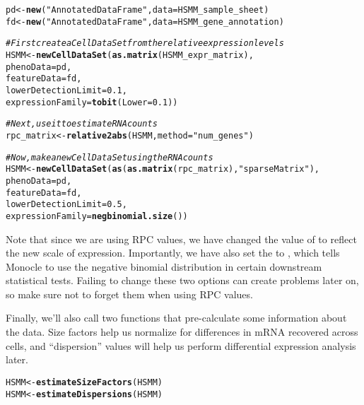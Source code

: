 \documentclass[10pt,oneside]{article}\usepackage[]{graphicx}\usepackage[]{color}
\makeatletter
\newcommand{\hlnum}[1]{\textcolor[rgb]{0.686,0.059,0.569}{#1}}%
\newcommand{\hlstr}[1]{\textcolor[rgb]{0.192,0.494,0.8}{#1}}%
\newcommand{\hlcom}[1]{\textcolor[rgb]{0.678,0.584,0.686}{\textit{#1}}}%
\newcommand{\hlstd}[1]{\textcolor[rgb]{0.345,0.345,0.345}{#1}}%
\newcommand{\hlkwb}[1]{\textcolor[rgb]{0.69,0.353,0.396}{#1}}%
\newcommand{\hlkwc}[1]{\textcolor[rgb]{0.333,0.667,0.333}{#1}}%
\newcommand{\hlkwd}[1]{\textcolor[rgb]{0.737,0.353,0.396}{\textbf{#1}}}%
\newenvironment{kframe}{%
 \def\at@end@of@kframe{}%
 \ifinner\ifhmode%
  \def\at@end@of@kframe{\end{minipage}}%
  \begin{minipage}{\columnwidth}%
 \fi\fi%
 \def\FrameCommand##1{\hskip\@totalleftmargin \hskip-\fboxsep
 \colorbox{shadecolor}{##1}\hskip-\fboxsep
     \hskip-\linewidth \hskip-\@totalleftmargin \hskip\columnwidth}%
 \MakeFramed {\advance\hsize-\width
   \@totalleftmargin\z@ \linewidth\hsize
   \@setminipage}}%
 {\par\unskip\endMakeFramed%
 \at@end@of@kframe}
\newenvironment{knitrout}{}{} %
\makeatother
\begin{document}
\begin{knitrout}
\color{fgcolor}\begin{kframe}
\begin{alltt}
\hlstd{pd} \hlkwb{<-} \hlkwd{new}\hlstd{(}\hlstr{"AnnotatedDataFrame"}\hlstd{,} \hlkwc{data} \hlstd{= HSMM_sample_sheet)}
\hlstd{fd} \hlkwb{<-} \hlkwd{new}\hlstd{(}\hlstr{"AnnotatedDataFrame"}\hlstd{,} \hlkwc{data} \hlstd{= HSMM_gene_annotation)}

\hlcom{# First create a CellDataSet from the relative expression levels}
\hlstd{HSMM} \hlkwb{<-} \hlkwd{newCellDataSet}\hlstd{(}\hlkwd{as.matrix}\hlstd{(HSMM_expr_matrix),}
                       \hlkwc{phenoData} \hlstd{= pd,}
                       \hlkwc{featureData} \hlstd{= fd,}
                       \hlkwc{lowerDetectionLimit}\hlstd{=}\hlnum{0.1}\hlstd{,}
                       \hlkwc{expressionFamily}\hlstd{=}\hlkwd{tobit}\hlstd{(}\hlkwc{Lower}\hlstd{=}\hlnum{0.1}\hlstd{))}

\hlcom{# Next, use it to estimate RNA counts}
\hlstd{rpc_matrix} \hlkwb{<-} \hlkwd{relative2abs}\hlstd{(HSMM,} \hlkwc{method} \hlstd{=} \hlstr{"num_genes"}\hlstd{)}

\hlcom{# Now, make a new CellDataSet using the RNA counts}
\hlstd{HSMM} \hlkwb{<-} \hlkwd{newCellDataSet}\hlstd{(}\hlkwd{as}\hlstd{(}\hlkwd{as.matrix}\hlstd{(rpc_matrix),} \hlstr{"sparseMatrix"}\hlstd{),}
                       \hlkwc{phenoData} \hlstd{= pd,}
                       \hlkwc{featureData} \hlstd{= fd,}
                       \hlkwc{lowerDetectionLimit}\hlstd{=}\hlnum{0.5}\hlstd{,}
                       \hlkwc{expressionFamily}\hlstd{=}\hlkwd{negbinomial.size}\hlstd{())}
\end{alltt}
\end{kframe}
\end{knitrout}
 
 Note that since we are using RPC values, we have changed the value of  to reflect the new scale of expression. Importantly, we have also set the  to , which tells Monocle to use the negative binomial distribution in certain downstream statistical tests. Failing to change these two options can create problems later on, so make sure not to forget them when using RPC values.
 
 
 Finally, we'll also call two functions that pre-calculate some information about the data. Size factors help us normalize for differences in mRNA recovered across cells, and ``dispersion'' values will help us perform differential expression analysis later.
\begin{knitrout}
\color{fgcolor}\begin{kframe}
\begin{alltt}
\hlstd{HSMM} \hlkwb{<-} \hlkwd{estimateSizeFactors}\hlstd{(HSMM)}
\hlstd{HSMM} \hlkwb{<-} \hlkwd{estimateDispersions}\hlstd{(HSMM)}
\end{alltt}


{\ttfamily\noindent\itshape\color{messagecolor}{\#\# Removing 139 outliers}}\end{kframe}
\end{knitrout}
 
\end{document}
